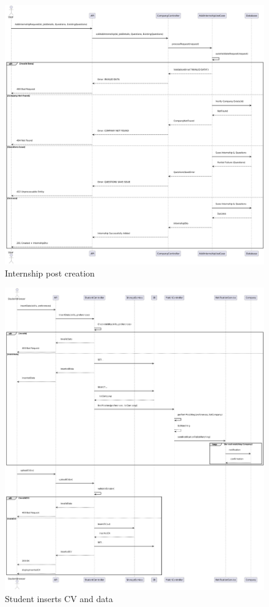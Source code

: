 \newpage

\begin{figure}[ht!]
    \centering
    \includegraphics[scale=0.3]{Images/ImagesSequenceDiagram/InternshipCreation.png}
    \caption{Internship post creation}
\end{figure}

\newpage

\begin{figure}[ht!]
    \centering
    \includegraphics[scale=0.28]{Images/ImagesSequenceDiagram/StudentUploadCV.png}
    \caption{Student inserts CV and data}
\end{figure}

